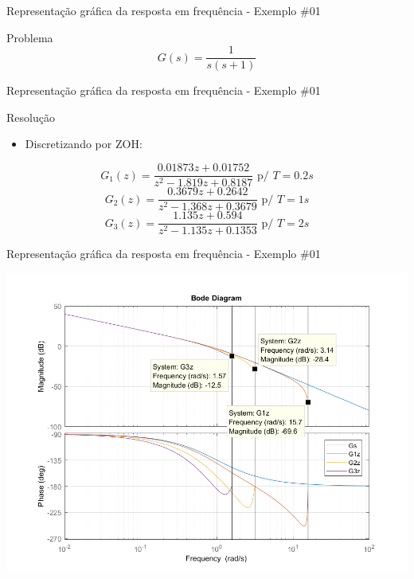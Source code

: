 \begin{frame}{Representação gráfica da resposta em frequência - Exemplo \#01}
\begin{block}{Problema}
\vspace{0.2cm}
    \begin{equation*}
        G(s) = \dfrac{1}{s(s + 1)}
    \end{equation*}
\end{block}
\end{frame}

\begin{frame}{Representação gráfica da resposta em frequência - Exemplo \#01}
\begin{block}{Resolução}
\begin{itemize}
    \item Discretizando por ZOH:
\end{itemize}
    \begin{equation*}
        G_1(z) = \dfrac{0.01873z + 0.01752}{z^2 - 1.819z + 0.8187} \text{  p/  } T = 0.2 s
    \end{equation*}
    \begin{equation*}
        G_2(z) = \dfrac{0.3679z + 0.2642}{z^2 - 1.368z + 0.3679} \text{  p/  } T = 1 s
    \end{equation*}
    \begin{equation*}
        G_3(z) = \dfrac{1.135z + 0.594}{z^2 - 1.135z + 0.1353} \text{  p/  } T = 2 s
    \end{equation*}
\end{block}
\end{frame}

\begin{frame}{Representação gráfica da resposta em frequência - Exemplo \#01}
\centerline{\includegraphics[width=0.9\linewidth]{Figuras/Ch13/fig4.png}}
\end{frame}

